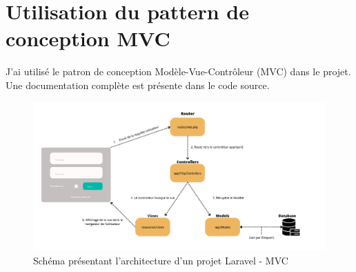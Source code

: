\newpage
\section{Utilisation du pattern de conception MVC}

J'ai utilisé le patron de conception Modèle-Vue-Contrôleur (MVC) dans le projet. Une documentation complète est présente dans le code source. 

\begin{figure}[H]
	\centering
	\includegraphics[width=18cm, keepaspectratio]{images/MVC}
	\caption{Schéma présentant l'architecture d'un projet Laravel - MVC}
\end{figure}